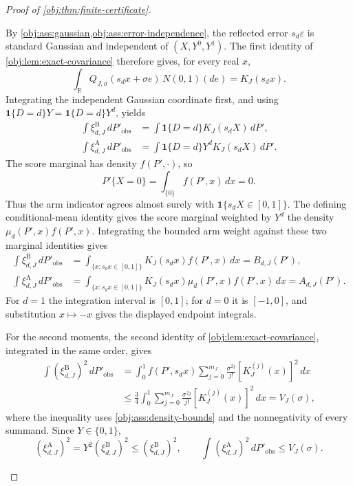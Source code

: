 \documentclass[11pt]{article}
\begin{document}
\begin{proof}[Proof of \cref{obj:thm:finite-certificate}]
\begin{enumerate}
By \cref{obj:ass:gaussian,obj:ass:error-independence}, the reflected error \(s_d\varepsilon\) is standard Gaussian and independent of \((X,Y^0,Y^1)\). The first identity of \cref{obj:lem:exact-covariance} therefore gives, for every real \(x\),
\[
\int_{\mathbb R}Q_{J,\sigma}(s_dx+\sigma e)\,N(0,1)(de)
=K_J(s_dx).
\]
Integrating the independent Gaussian coordinate first, and using
\(\mathbf1\{D=d\}Y=\mathbf1\{D=d\}Y^d\), yields
\[
\begin{aligned}
\int \xi^{\mathrm B}_{d,J}\,dP'_{\mathrm{obs}}
&=\int \mathbf1\{D=d\}K_J(s_dX)\,dP',\\
\int \xi^{\mathrm A}_{d,J}\,dP'_{\mathrm{obs}}
&=\int \mathbf1\{D=d\}Y^dK_J(s_dX)\,dP'.
\end{aligned}
\]
The score marginal has density \(f(P',\cdot)\), so
\[
P'\{X=0\}=\int_{\{0\}}f(P',x)\,dx=0.
\]
Thus the arm indicator agrees almost surely with
\(\mathbf1\{s_dX\in[0,1]\}\). The defining conditional-mean identity gives the score marginal weighted by \(Y^d\) the density
\(\mu_d(P',x)f(P',x)\). Integrating the bounded arm weight against these two marginal identities gives
\[
\begin{aligned}
\int \xi^{\mathrm B}_{d,J}\,dP'_{\mathrm{obs}}
&=\int_{\{x:s_dx\in[0,1]\}}K_J(s_dx)f(P',x)\,dx
=B_{d,J}(P'),\\
\int \xi^{\mathrm A}_{d,J}\,dP'_{\mathrm{obs}}
&=\int_{\{x:s_dx\in[0,1]\}}
K_J(s_dx)\mu_d(P',x)f(P',x)\,dx
=A_{d,J}(P').
\end{aligned}
\]
For \(d=1\) the integration interval is \([0,1]\); for \(d=0\) it is \([-1,0]\), and substitution \(x\mapsto-x\) gives the displayed endpoint integrals.

For the second moments, the second identity of
\cref{obj:lem:exact-covariance}, integrated in the same order, gives
\[
\begin{aligned}
\int (\xi^{\mathrm B}_{d,J})^2\,dP'_{\mathrm{obs}}
&=\int_0^1 f(P',s_dx)
\sum_{j=0}^{m_J}\frac{\sigma^{2j}}{j!}
[K_J^{(j)}(x)]^2\,dx\\
&\le\frac34\int_0^1
\sum_{j=0}^{m_J}\frac{\sigma^{2j}}{j!}
[K_J^{(j)}(x)]^2\,dx
=V_J(\sigma),
\end{aligned}
\]
where the inequality uses \cref{obj:ass:density-bounds} and the nonnegativity of every summand. Since \(Y\in\{0,1\}\),
\[
(\xi^{\mathrm A}_{d,J})^2
=Y^2(\xi^{\mathrm B}_{d,J})^2
\le(\xi^{\mathrm B}_{d,J})^2,
\qquad
\int(\xi^{\mathrm A}_{d,J})^2\,dP'_{\mathrm{obs}}
\le V_J(\sigma).
\]


\end{enumerate}
\end{proof}
\end{document}
